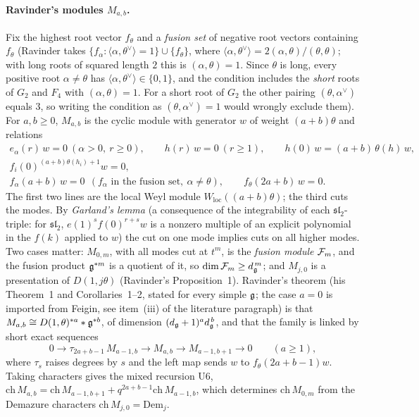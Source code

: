 \paragraph{Ravinder's modules $M_{a,b}$.} Fix the highest root vector $f_\theta$ and a \emph{fusion set} of negative root
vectors containing $f_\theta$ (Ravinder takes $\{f_\alpha:\langle\alpha,\theta^\vee\rangle=1\}\cup\{f_\theta\}$, where
$\langle\alpha,\theta^\vee\rangle=2(\alpha,\theta)/(\theta,\theta)$; with long roots of squared length $2$ this is $(\alpha,\theta)=1$.
Since $\theta$ is long, every positive root $\alpha\neq\theta$ has $\langle\alpha,\theta^\vee\rangle\in\{0,1\}$, and the
condition includes the \emph{short} roots of $G_2$ and $F_4$ with $(\alpha,\theta)=1$. For a short root of $G_2$ the other
pairing $(\theta,\alpha^\vee)$ equals $3$, so writing the condition as $(\theta,\alpha^\vee)=1$ would wrongly exclude
them). For $a,b\ge0$, $M_{a,b}$
is the cyclic module with generator $w$ of weight $(a+b)\theta$ and relations
\begin{gather*}
e_\alpha(r)\,w=0\ (\alpha>0,\ r\ge0),\qquad h(r)\,w=0\ (r\ge1),\qquad h(0)\,w=(a+b)\,\theta(h)\,w,\\
f_i(0)^{(a+b)\theta(h_i)+1}w=0,\\
f_\alpha(a+b)\,w=0\ \ (f_\alpha\text{ in the fusion set},\ \alpha\ne\theta),\qquad f_\theta(2a+b)\,w=0 .
\end{gather*}
The first two lines are the local Weyl module $W_{\mathrm{loc}}((a+b)\theta)$; the third cuts the modes. By \emph{Garland's
lemma} (a consequence of the integrability of each $\mathfrak{sl}_2$-triple: for $\mathfrak{sl}_2$, $e(1)^sf(0)^{r+s}w$ is a
nonzero multiple of an explicit polynomial in the $f(k)$ applied to $w$) the cut on one mode implies cuts on all higher modes.
Two cases matter: $M_{0,m}$, with all modes cut at $t^m$, is the \emph{fusion module} $\mathcal F_m$, and the fusion
product $\mathfrak g^{*m}$ is a quotient of it, so $\dim\mathcal F_m\ge d_{\mathfrak g}^{\,m}$; and $M_{j,0}$ is a
presentation of $D(1,j\theta)$ (Ravinder's Proposition~1). Ravinder's theorem (his Theorem~1 and Corollaries~1--2,
stated for every simple $\mathfrak g$; the case $a=0$ is imported from Feigin, see item~(iii) of the literature paragraph)
is that $M_{a,b}\cong D(1,\theta)^{*a}*\mathfrak g^{*b}$, of dimension $(d_{\mathfrak g}+1)^ad_{\mathfrak g}^{\,b}$, and
that the family is linked by short exact sequences
\begin{equation}\label{l27:eq:ravinder}
0\longrightarrow \tau_{2a+b-1}\,M_{a-1,b}\longrightarrow M_{a,b}\longrightarrow M_{a-1,b+1}\longrightarrow0
\qquad(a\ge1),
\end{equation}
where $\tau_s$ raises degrees by $s$ and the left map sends $w$ to $f_\theta(2a+b-1)w$. Taking characters gives the mixed
recursion U6, $\mathrm{ch}\,M_{a,b}=\mathrm{ch}\,M_{a-1,b+1}+q^{2a+b-1}\mathrm{ch}\,M_{a-1,b}$, which determines
$\mathrm{ch}\,M_{0,m}$ from the Demazure characters $\mathrm{ch}\,M_{j,0}=\mathrm{Dem}_j$.

